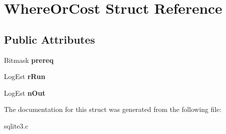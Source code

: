 \hypertarget{structWhereOrCost}{}\section{Where\+Or\+Cost Struct Reference}
\label{structWhereOrCost}
\subsection*{Public Attributes}
\begin{DoxyCompactItemize}
\item 
Bitmask {\bfseries prereq}\hypertarget{structWhereOrCost_a42609e928af86f1783c1e579873b2b4d}{}\label{structWhereOrCost_a42609e928af86f1783c1e579873b2b4d}

\item 
Log\+Est {\bfseries r\+Run}\hypertarget{structWhereOrCost_ac79c4a236da795623ec2a40592fe2617}{}\label{structWhereOrCost_ac79c4a236da795623ec2a40592fe2617}

\item 
Log\+Est {\bfseries n\+Out}\hypertarget{structWhereOrCost_af2305e66af19f5cc067178bcc4fb34a8}{}\label{structWhereOrCost_af2305e66af19f5cc067178bcc4fb34a8}

\end{DoxyCompactItemize}


The documentation for this struct was generated from the following file\+:\begin{DoxyCompactItemize}
\item 
sqlite3.\+c\end{DoxyCompactItemize}
